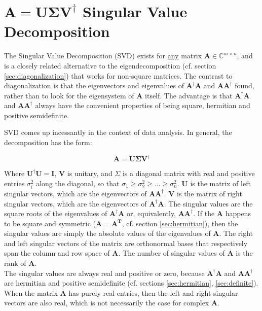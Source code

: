 \section{$\mathbf{A} = \mathbf{U\Sigma V}^{\dagger}$ Singular Value Decomposition}
\label{sec:svd}

The Singular Value Decomposition (SVD) exists for \underline{any} matrix $\mathbf{A}\in\mathbb{C}^{m\times n}$, and is a closely related alternative to the eigendecomposition (cf. section \ref{sec:diagonalization}) that works for non-square matrices. The contrast to diagonalization is that the eigenvectors and eigenvalues of $\mathbf{A}^{\dagger}\mathbf{A}$ and $\mathbf{A}\mathbf{A}^{\dagger}$ found, rather than to look for the eigensystem of $\mathbf{A}$ itself. The advantage is that $\mathbf{A}^{\dagger}\mathbf{A}$ and $\mathbf{A}\mathbf{A}^{\dagger}$ always have the convenient properties of being square, hermitian and positive semidefinite. 

SVD comes up incessantly in the context of data analysis. In general, the decomposition has the form:

\begin{equation}
\mathbf{A} = \mathbf{U\Sigma V^{\dagger}}
\end{equation}

Where $\mathbf{U^{\dagger}}\mathbf{U} = \mathbf{I}$, $\mathbf{V}$ is unitary, and $\Sigma$ is a diagonal matrix with real and positive entries $\sigma_i^2$ along the diagonal, so that $\sigma_1 \geq \sigma^2_2 \geq ...\geq \sigma^2_n$. $\mathbf{U}$ is the matrix of left singular vectors, which are the eigenvectors of $\mathbf{A A^{\dagger}}$. $\mathbf{V}$ is the matrix of right singular vectors, which are the eigenvectors of $\mathbf{A^{\dagger} A}$. The singular values are the square roots of the eigenvalues of $\mathbf{A^{\dagger}A}$ or, equivalently, $\mathbf{AA^{\dagger}}$. If the $\mathbf{A}$ happens to be square and symmetric ($\mathbf{A}=\mathbf{A^T}$, cf. section \ref{sec:hermitian}), then the singular values are simply the absolute values of the eigenvalues of $\mathbf{A}$. The right and left singular vectors of the matrix are orthonormal bases that respectively span the column and row space of $\mathbf{A}$. The number of singular values of $\mathbf{A}$ is the rank of $\mathbf{A}$.
\\
The singular values are always real and positive or zero, because $\mathbf{A^{\dagger} A}$ and $\mathbf{A A^{\dagger}}$ are  hermitian and positive semidefinite (cf. sections \ref{sec:hermitian}, \ref{sec:definite}). When the matrix $\mathbf{A}$ has purely real entries, then the left and right singular vectors are also real, which is not necessarily the case for complex $\mathbf{A}$.
\\

